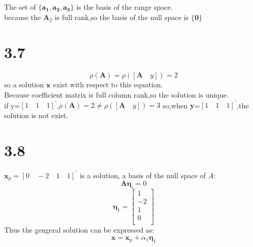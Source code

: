 \documentclass{article}
\begin{document}
The set of  $\{\boldsymbol{a_1},\boldsymbol{a_2},\boldsymbol{a_3}\}$ is the basis of the range space.\\
because the $\boldsymbol{A}_2$ is full rank,so the basis of the null space is $\{\boldsymbol{0}\}$

\section*{3.7}
\[\rho(\boldsymbol{A})=\rho([\boldsymbol{A}\quad y])=2\]
so a solution $\boldsymbol{x}$ exist with respect to this equation.\\
Because coefficient matrix is full column rank,so the solution is unique.\\
if y=$[1\quad 1\quad 1]^{'}$,$\rho(\boldsymbol{A})=2 \neq \rho([\boldsymbol{A}\quad y])=3$
so,when $\boldsymbol{y}$=$[1 \quad 1\quad 1]^{'}$,the solution is not exist.

\section*{3.8}
$\boldsymbol{x}_p=[0\quad -2\quad 1\quad 1]^{'}$ is a solution, a basis of the null space of $A$:
\[\boldsymbol{A} \boldsymbol{\eta}_i=0\]
\begin{equation*}
\boldsymbol{\eta}_1=
\left[
\begin{array}{c}
1\\
-2\\
1\\
0\\
\end{array}
\right]
\end{equation*}
Thus the gengeral solution can be expressed as:
\[\boldsymbol{x}=\boldsymbol{x}_p+\alpha_1 \boldsymbol{\eta}_1\]
\end{document}
